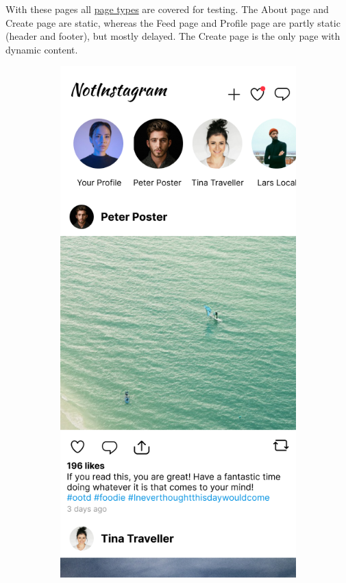 \documentclass[a4paper, 12pt]{article}
\begin{document}
With these pages all \hyperref[enum:pagetypes]{page types} are covered for testing.
The About page and Create page are static, whereas the Feed page and Profile page are partly static (header and footer), but mostly delayed.
The Create page is the only page with dynamic content.

\begin{figure}[ht!]
  \begin{subfigure}{0.49\linewidth}
    \begin{center}
      \includegraphics[width=\linewidth, height=0.3\textheight, keepaspectratio,frame]{img/ig-clone/Feed.png}

\end{center}
\end{subfigure}
\end{figure}
\end{document}
